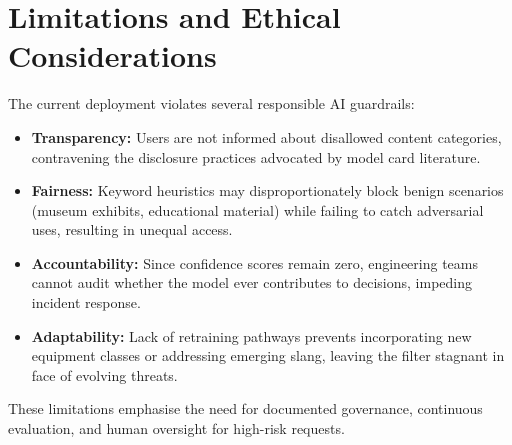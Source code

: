\documentclass[conference]{IEEEtran}
\begin{document}
\section{Limitations and Ethical Considerations}
The current deployment violates several responsible AI guardrails:
\begin{itemize}[leftmargin=*]
  \item \textbf{Transparency:} Users are not informed about disallowed content categories, contravening the disclosure practices advocated by model card literature\cite{mitchell2019modelcards, huggingface2023modelcards}.
  \item \textbf{Fairness:} Keyword heuristics may disproportionately block benign scenarios (museum exhibits, educational material) while failing to catch adversarial uses, resulting in unequal access.
  \item \textbf{Accountability:} Since confidence scores remain zero, engineering teams cannot audit whether the model ever contributes to decisions, impeding incident response.
  \item \textbf{Adaptability:} Lack of retraining pathways prevents incorporating new equipment classes or addressing emerging slang, leaving the filter stagnant in face of evolving threats.
\end{itemize}
These limitations emphasise the need for documented governance, continuous evaluation, and human oversight for high-risk requests.
\end{document}
